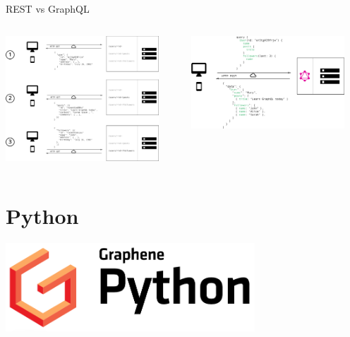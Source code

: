\documentclass[14pt]{beamer}
\begin{document}
\begin{frame}{REST vs GraphQL}
  \begin{center}
   \begin{columns}
     \begin{column}{0.5\textwidth}
    \includegraphics[width=0.9\textwidth]{REST.png}
     \end{column}
     \begin{column}{0.5\textwidth}  %
    \includegraphics[width=0.9\textwidth]{howgraphql.png}
     \end{column}
     \end{columns}
  \end{center}
\end{frame}


\section{Python}
\begin{frame}
  \begin{center}
    \includegraphics[width=0.7\textwidth]{graphenepython.png}
  \end{center}
\end{frame}
\end{document}
